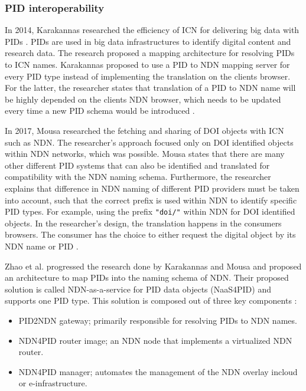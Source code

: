 \subsubsection{PID interoperability}
\label{introduction-pid}
In 2014, Karakannas researched the efficiency of ICN for delivering big data with PIDs \cite{icn-bd}. PIDs are used in big data infrastructures to identify digital content and research data. The research proposed a mapping architecture for resolving PIDs to ICN names. Karakannas proposed to use a PID to NDN mapping server for every PID type instead of implementing the translation on the clients browser. For the latter, the researcher states that translation of a PID to NDN name will be highly depended on the clients NDN browser, which needs to be updated every time a new PID schema would be introduced \cite{icn-bd}.

In 2017, Mousa researched the fetching and sharing of DOI objects with ICN such as NDN. 
The researcher's approach focused only on DOI identified objects within NDN networks, which was possible. Mousa states that there are many other different PID systems that can also be identified and translated for compatibility with the NDN naming schema. Furthermore, the researcher explains that difference in NDN naming of different PID providers must be taken into account, such that the correct prefix is used within NDN to identify specific PID types. For example, using the prefix \texttt{"doi/"} within NDN for DOI identified objects.
In the researcher's design, the translation happens in the consumers browsers. The consumer has the choice to either request the digital object by its NDN name or PID \cite{ndn-app-aware}.

Zhao et al. progressed the research done by Karakannas \cite{icn-bd} and Mousa \cite{ndn-app-aware} and proposed an architecture to map PIDs into the naming schema of NDN. Their proposed solution is called NDN-as-a-service for PID data objects (NaaS4PID) and supports one PID type. This solution is composed out of three key components \cite{icn-resteam}:
\begin{itemize}
  \item PID2NDN gateway; primarily responsible for resolving PIDs to NDN names.
  \item NDN4PID router image; an NDN node that implements a virtualized NDN router.
  \item NDN4PID manager; automates the management of the NDN overlay in\newline cloud or e-infrastructure.
\end{itemize}

